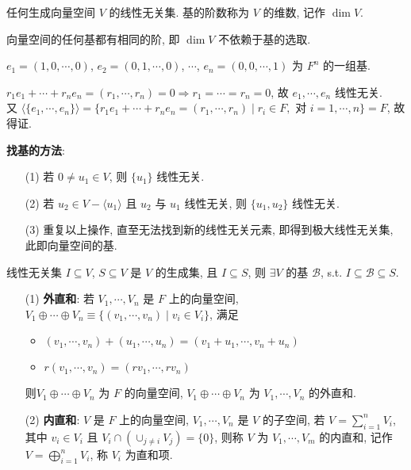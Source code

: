 \documentclass{note}
\begin{document}
\begin{df}[基]
    任何生成向量空间 $V$ 的线性无关集. 基的阶数称为 $V$ 的维数, 记作 $\dim V$.
\end{df}

\begin{thm}[(课本定理 1.12)]
    向量空间的任何基都有相同的阶, 即 $\dim V$ 不依赖于基的选取.
\end{thm}

\begin{eg}
    $e_1=(1,0,\cdots,0)$, $e_2=(0,1,\cdots,0)$, $\cdots$, $e_n=(0,0,\cdots,1)$ 为 $F^n$ 的一组基.
\end{eg}
\begin{pf}
    $r_1e_1+\cdots+r_ne_n=(r_1,\cdots,r_n)=0\Longrightarrow r_1=\cdots=r_n=0$, 故 $e_1,\cdots,e_n$ 线性无关.\\
    又 $\langle\{e_1,\cdots,e_n\}\rangle=\{r_1e_1+\cdots+r_ne_n=(r_1,\cdots,r_n)\mid r_i\in F,\text{ 对 }i=1,\cdots,n\}=F$, 故得证.
\end{pf}

\textbf{找基的方法}:
\begin{itemize}
    \item[(1)] 若 $0\neq u_1\in V$, 则 $\{u_1\}$ 线性无关.
    \item[(2)] 若 $u_2\in V-\langle u_1\rangle$ 且 $u_2$ 与 $u_1$ 线性无关, 则 $\{u_1,u_2\}$ 线性无关.
    \item[(3)] 重复以上操作, 直至无法找到新的线性无关元素, 即得到极大线性无关集, 此即向量空间的基.
\end{itemize}

\begin{thm}[(课本定理 1.9)]
    线性无关集 $I\subseteq V$, $S\subseteq V$ 是 $V$ 的生成集, 且 $I\subseteq S$, 则 $\exists V$ 的基 $\mathcal{B}$, s.t. $I\subseteq\mathcal{B}\subseteq S$.
\end{thm}

\begin{df}[直和]
    \begin{itemize}
        \item[(1)] \textbf{外直和}: 若 $V_1,\cdots,V_n$ 是 $F$ 上的向量空间, $V_1\oplus\cdots\oplus V_n\equiv\{(v_1,\cdots,v_n)\mid v_i\in V_i\}$, 满足
        \begin{itemize}
            \item $(v_1,\cdots,v_n)+(u_1,\cdots,u_n)=(v_1+u_1,\cdots,v_n+u_n)$
            \item $r(v_1,\cdots,v_n)=(rv_1,\cdots,rv_n)$
        \end{itemize}
        则$V_1\oplus\cdots\oplus V_n$ 为 $F$ 的向量空间, $V_1\oplus\cdots\oplus V_n$ 为 $V_1,\cdots,V_n$ 的外直和.
        \item[(2)] \textbf{内直和}: $V$ 是 $F$ 上的向量空间, $V_1,\cdots,V_n$ 是 $V$ 的子空间, 若 $V=\sum_{i=1}^nV_i$, 其中 $v_i\in V_i$ 且 $V_i\cap(\cup_{j\neq i}V_j)=\{0\}$, 则称 $V$ 为 $V_1,\cdots,V_m$ 的内直和, 记作 $V=\bigoplus_{i=1}^nV_i$, 称 $V_i$ 为直和项.
    \end{itemize}
\end{df}
\end{document}
